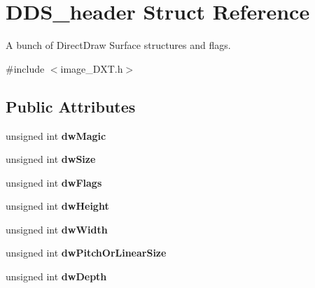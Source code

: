 \hypertarget{struct_d_d_s__header}{\section{D\-D\-S\-\_\-header Struct Reference}
\label{struct_d_d_s__header}
}


A bunch of Direct\-Draw Surface structures and flags.  




{\ttfamily \#include $<$image\-\_\-\-D\-X\-T.\-h$>$}

\subsection*{Public Attributes}
\begin{DoxyCompactItemize}
\item 
\hypertarget{struct_d_d_s__header_ae92b8a57c39f167862e6fc963bbe3a22}{unsigned int {\bfseries dw\-Magic}}\label{struct_d_d_s__header_ae92b8a57c39f167862e6fc963bbe3a22}

\item 
\hypertarget{struct_d_d_s__header_a0547c8dec53be12586207d350a66ee67}{unsigned int {\bfseries dw\-Size}}\label{struct_d_d_s__header_a0547c8dec53be12586207d350a66ee67}

\item 
\hypertarget{struct_d_d_s__header_a7703db822d8a22fa9a1f806e9ec2d6d9}{unsigned int {\bfseries dw\-Flags}}\label{struct_d_d_s__header_a7703db822d8a22fa9a1f806e9ec2d6d9}

\item 
\hypertarget{struct_d_d_s__header_a70fb20dd52718b1334b3a9c9ca70145f}{unsigned int {\bfseries dw\-Height}}\label{struct_d_d_s__header_a70fb20dd52718b1334b3a9c9ca70145f}

\item 
\hypertarget{struct_d_d_s__header_a91d4282a7b838a8f691a7504e56223f0}{unsigned int {\bfseries dw\-Width}}\label{struct_d_d_s__header_a91d4282a7b838a8f691a7504e56223f0}

\item 
\hypertarget{struct_d_d_s__header_a679fd9c7706adab8eb5b9470616a90a9}{unsigned int {\bfseries dw\-Pitch\-Or\-Linear\-Size}}\label{struct_d_d_s__header_a679fd9c7706adab8eb5b9470616a90a9}

\item 
\hypertarget{struct_d_d_s__header_ab458ba3768aa3aed2899e947946131c6}{unsigned int {\bfseries dw\-Depth}}\label{struct_d_d_s__header_ab458ba3768aa3aed2899e947946131c6}


\end{DoxyCompactItemize}
